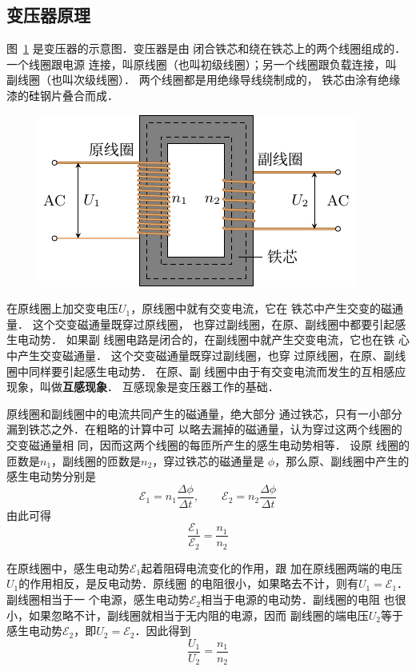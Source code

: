 \subsection{变压器原理}


图~\ref{fig_C_3-25} 是变压器的示意图．变压器是由
闭合铁芯和绕在铁芯上的两个线圈组成的．一个线圈跟电源
连接，叫原线圈（也叫初级线圈）；另一个线圈跟负载连接，叫
副线圈（也叫次级线圈）．
两个线圈都是用绝缘导线绕制成的，
铁芯由涂有绝缘漆的硅钢片叠合而成．
\begin{figure}[htbp]
	\centering
	\includegraphics{fig/C/3-25.pdf}
	\caption{}\label{fig_C_3-25}
\end{figure}


在原线圈上加交变电压$U_1$，原线圈中就有交变电流，它在
铁芯中产生交变的磁通量．
这个交变磁通量既穿过原线圈，
也穿过副线圈，在原、副线圈中都要引起感生电动势．
如果副
线圈电路是闭合的，在副线圈中就产生交变电流，它也在铁
心中产生交变磁通量．
这个交变磁通量既穿过副线圈，也穿
过原线圈，在原、副线圈中同样要引起感生电动势．
在原、副
线圈中由于有交变电流而发生的互相感应现象，叫做\textbf{互感现象}．
互感现象是变压器工作的基础．

原线圈和副线圈中的电流共同产生的磁通量，绝大部分
通过铁芯，只有一小部分漏到铁芯之外．在粗略的计算中可
以略去漏掉的磁通量，认为穿过这两个线圈的交变磁通量相
同，因而这两个线圈的每匝所产生的感生电动势相等．
设原
线圈的匝数是$n_1$，副线圈的匝数是$n_2$，穿过铁芯的磁通量是
$\phi$，那么原、副线圈中产生的感生电动势分别是
\[\mathcal{E}_1=n_1\frac{\Delta \phi}{\Delta t},\qquad  \mathcal{E}_2=n_2\frac{\Delta \phi}{\Delta t}\]
由此可得
\begin{equation}\label{eq_C_3-9}
    \frac{\mathcal{E}_1}{\mathcal{E}_2}=\frac{n_1}{n_2} 
\end{equation}

在原线圈中，感生电动势$\mathcal{E}_1$起着阻碍电流变化的作用，跟
加在原线圈两端的电压$U_1$的作用相反，是反电动势．原线圈
的电阻很小，如果略去不计，则有$U_1=\mathcal{E}_1$．副线圈相当于一
个电源，感生电动势$\mathcal{E}_2$相当于电源的电动势．副线圈的电阻
也很小，如果忽略不计，副线圈就相当于无内阻的电源，因而
副线圈的端电压$U_2$等于感生电动势$\mathcal{E}_2$，即$U_2=\mathcal{E}_2$．因此得到
\begin{equation}\label{eq_C_3-10}
    \frac{U_1}{U_2}=\frac{n_1}{n_2} 
\end{equation}

